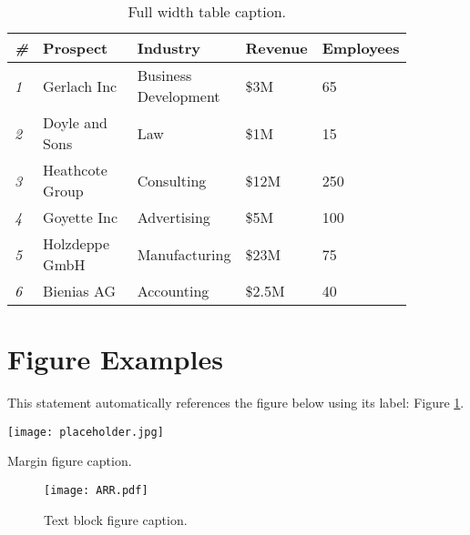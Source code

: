 
\begin{table*} %
  \caption{Full width table caption.}
  \begin{tabular}{C{0.03\linewidth} L{0.25\linewidth} L{0.27\linewidth} L{0.16\linewidth} L{0.16\linewidth}}
    \toprule
    \textit{\#} & \textbf{Prospect} & \textbf{Industry} & \textbf{Revenue} & \textbf{Employees} \\
    \midrule
    \textit{1} & Gerlach Inc & Business Development & \$3M & 65\\
    \textit{2} & Doyle and Sons & Law & \$1M & 15\\
    \textit{3} & Heathcote Group & Consulting & \$12M & 250\\
    \textit{4} & Goyette Inc & Advertising & \$5M & 100\\
    \textit{5} & Holzdeppe GmbH & Manufacturing & \$23M & 75\\
    \textit{6} & Bienias AG & Accounting & \$2.5M & 40\\
    \bottomrule
  \end{tabular}
\end{table*}


\section{Figure Examples}

This statement automatically references the figure below using its label: Figure \ref{fig:example}.


\begin{marginfigure} %
  \texttt{[image: placeholder.jpg]}
  \caption{Margin figure caption.}
\end{marginfigure}


\begin{figure}[H] %
  \texttt{[image: ARR.pdf]}
  \caption{Text block figure caption.}
  \label{fig:example} %
\end{figure}


